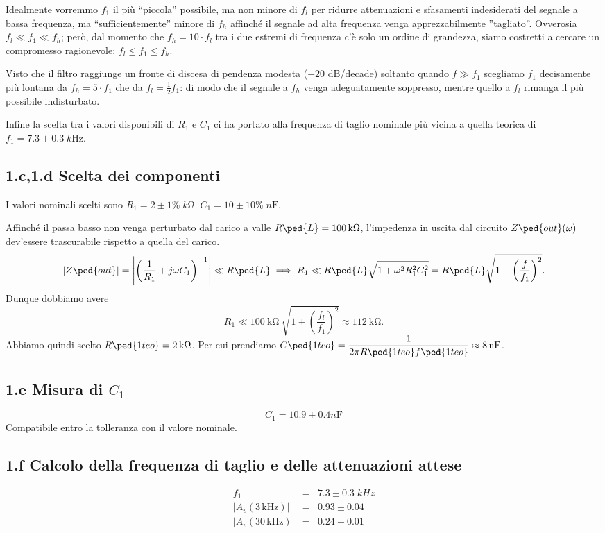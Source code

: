 \documentclass[10pt,a4paper]{article}
\begin{document}
Idealmente vorremmo $f_1$ il più ``piccola'' possibile, ma non minore
di $f_l$ per ridurre attenuazioni e sfasamenti indesiderati del segnale
a bassa frequenza, ma ``sufficientemente'' minore di $f_h $ affinché il
segnale ad alta frequenza venga apprezzabilmente ''tagliato''. Ovverosia
$f_l \ll f_1 \ll f_h$; però, dal momento che $f_h = 10 \cdot f_l$ tra i due
estremi di frequenza c'è solo un ordine di grandezza, siamo costretti a
cercare un compromesso ragionevole: $f_l \leq f_1 \leq f_h$.

Visto che il filtro raggiunge un fronte di discesa di pendenza modesta
($-20$ dB/decade) soltanto quando $f \gg f_1$ scegliamo $f_1$ decisamente
più lontana da $f_h = 5 \cdot f_1$ che da $f_l = \frac{1}{2} f_1$:
di modo che il segnale a $f_h$ venga adeguatamente soppresso, mentre quello
a $f_l$ rimanga il più possibile indisturbato.

Infine la scelta tra i valori disponibili di $R_1$ e $C_1$ ci ha portato alla
frequenza di taglio nominale più vicina a quella teorica di 
$f_1 = 7.3 \pm 0.3 \; \si{k\Hz}$. 

\subsection*{1.c,1.d Scelta dei componenti}

I valori nominali scelti sono $R_1 = 2 \pm 1\% \; \si{k\ohm} \;\; 
C_1 = 10 \pm 10\% \; \si{n\F}$.  

Affinché il passa basso non venga perturbato dal carico a valle
$R\ped{L} = \SI{100}{\kilo\ohm}$, l'impedenza in uscita dal circuito
$Z\ped{out}(\omega)$ dev'essere trascurabile rispetto a quella del carico.
\[
\abs{Z\ped{out}} = \abs{\left(\frac{1}{R_1} + j\omega 
C_1\right)^{-1}} \ll R\ped{L} \implies R_1 \ll
R\ped{L} \sqrt{1 + \omega^2 R_1^2 C_1^2} =
R\ped{L} \sqrt{1 + \left(\frac{f}{f_1}\right)^2}.
\]
Dunque dobbiamo avere
\[
R_1 \ll \SI{100}{\kilo\ohm}  \ \sqrt{1 + 
\left(\frac{f_l}{f_1}\right)^2} \approx \SI{112}{\kilo\ohm}.
\]
Abbiamo quindi scelto $R\ped{1 teo} = \SI{2}{\kilo\ohm}$.
Per cui prendiamo $C\ped{1 teo} =
\ds \frac{1}{2\pi R\ped{1 teo} f\ped{1 teo}} \approx \SI{8}{\nano\farad}$. 
\subsection*{1.e Misura di $C_1$}
\[
C_1 = 10.9 \pm 0.4 \si{n\F}
\]
Compatibile entro la tolleranza con il valore nominale.

\subsection*{1.f Calcolo della frequenza di taglio e delle attenuazioni attese}
\[
\begin{array}{rcl}
f_1 &=& 7.3 \pm 0.3 \; \si{kHz}\\ 
|A_v(3\,\mathrm{kHz})| &=& 0.93 \pm 0.04 \\
|A_v(30\,\mathrm{kHz})| &=& 0.24 \pm 0.01
\end{array}
\]
\end{document}
